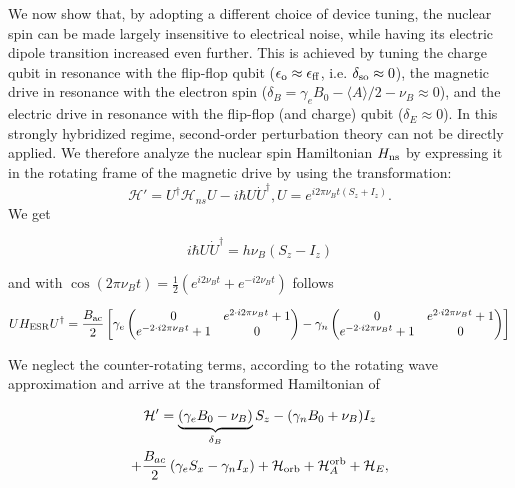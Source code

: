 We now show that, by adopting a different choice of device tuning, the nuclear spin can be made largely insensitive to electrical noise, while having its electric dipole transition increased even further. This is achieved by tuning the charge qubit in resonance with the flip-flop qubit ($\epsilon_{\rm o} \approx \epsilon_{\rm ff}$, i.e. $\delta_{\rm so}\approx 0$), the magnetic drive in resonance with the electron spin ($\delta_B = \gamma_eB_0 - \langle A \rangle /2 -\nu_B\approx 0$), and the electric drive in resonance with the flip-flop (and charge) qubit ($\delta_E \approx 0$). In this strongly hybridized regime, second-order perturbation theory can not be directly applied. We therefore analyze the nuclear spin Hamiltonian $H_{\rm ns}$ by expressing it in the rotating frame of the magnetic drive by using the transformation:
\begin{subequations}
\begin{equation}
\mathcal{H}'=U^\dagger\mathcal{H}_{ns}U-i\hbar U\dot{U}^\dagger,
\end{equation}
\begin{equation}
U=e^{i2\pi\nu_Bt\left(S_z+I_z\right)}.
\end{equation}
\end{subequations}
We get

\begin{equation}
i\hbar U\dot{U}^\dagger=h\nu_B\left(S_z-I_z\right)
\end{equation}

and with $\cos(2\pi\nu_B t)=\frac{1}{2}\left(e^{i2\nu_B t}+e^{-i2\nu_B t}\right)$ follows

\begin{equation}
UH_{\rm ESR}U^\dagger=\frac{B_{\rm ac}}{2}\left[\gamma_e
\begin{pmatrix}
0 & e^{2\cdot i2\pi\nu_Bt}+1\\
e^{-2\cdot i2\pi\nu_Bt}+1 & 0
\end{pmatrix}-
\gamma_n\begin{pmatrix}
0 & e^{2\cdot i2\pi\nu_Bt}+1\\
e^{-2\cdot i2\pi\nu_Bt}+1 & 0
\end{pmatrix}\right]
\end{equation}

We neglect the counter-rotating terms, according to the rotating wave approximation and arrive at the transformed Hamiltonian of 

\begin{multline} \label{eq:H_nsRot}
\mathcal{H}'=\underbrace{\left(\gamma_e B_0 - \nu_B\right)}_{\delta_B}S_z-(\gamma_nB_0+\nu_B)I_z\\
+\frac{B_{ac}}{2}\left(\gamma_eS_x-\gamma_nI_x\right)+\mathcal{H}_{\rm orb}+\mathcal{H}_A^{\rm orb}+\mathcal{H}_E,
\end{multline}

